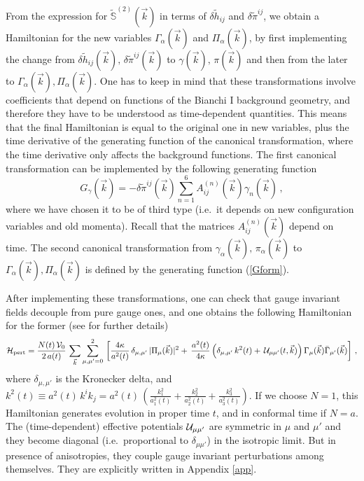 \documentclass[11pt,tightenlines,eqsecnum,floats,aps,amsmath,amssymb,nofootinbib,prd,floatfix]{revtex4}
\newcommand{\be}{\nopagebreak[3]\begin{equation}}
\newcommand{\ee}{\end{equation}}
\def\v{\vec}
\newcommand{\<}{\langle}
\renewcommand{\>}{\rangle}
\begin{document}
From the expression for $\tilde{\mathbb{S}}^{(2)}(\vec k)$ in terms of $\delta \tilde{h}_{ij}$ and $\delta \tilde{\pi}^{ij}$, we obtain a Hamiltonian for the new variables $\Gamma_\alpha(\vec k)$ and $\Pi_{\alpha}(\vec k)$, by first implementing the change from $\delta \tilde{h}_{ij}(\vec k),\,  \delta \tilde{\pi}^{ij}(\vec k)$ to $\gamma(\vec k),\, \pi(\vec k)$ and then from the later to $\Gamma_\alpha(\vec k), \Pi_{\alpha}(\vec k)$. One has to keep in mind that these transformations involve coefficients that depend on functions of the Bianchi I background geometry, and therefore they have to be understood as time-dependent quantities. This means that the final Hamiltonian is equal to the original one in new variables, plus the time derivative of the generating function of the canonical transformation, where the time derivative only affects the background functions. The first  canonical transformation  can be implemented by the following generating function 
\begin{equation} \label{gform}
G_{\gamma}(\v k) = - \delta \tilde{\pi}^{ij}(\v k) \sum_{n=1}^6A^{(n)}_{ij}(\v k) \gamma_n(\v k)\, ,  
\end{equation}
where we have chosen it to be of third type (i.e.\, it depends on new configuration variables and old momenta). Recall that the matrices  $A^{(n)}_{ij}(\v k)$ depend on time. The second canonical transformation from $\gamma_\alpha(\vec k),\, \pi_\alpha(\vec k)$ to $\Gamma_\alpha(\vec k), \Pi_{\alpha}(\vec k)$ is defined by the generating function (\ref{Gform}).  

After implementing these transformations, one can check that  gauge invariant fields decouple from pure gauge ones, and one obtains the following Hamiltonian for the former (see \cite{aos} for further details)
\be \label{Ham2}\mathcal{H_{\rm pert}}=\frac{N(t)\,{\cal V}_0}{2\, a(t)}\, \sum_{\vec k}\sum_{\mu,\mu'=0}^2\, \left[ \frac{4\kappa}{a^2(t)}\, \delta_{\mu,\mu'}\, |\Pi_{\mu}(\vec k)|^2+\, \frac{a^2(t)}{4\kappa}\, \Big( \delta_{\mu,\mu'}\, k^2(t)+\, {\cal U}_{\mu \mu'}(t,\vec k)\Big)\, \Gamma_{\mu}(\vec k)\bar \Gamma_{\mu '}(\vec k)\right]\, ,\ee
where $\delta_{\mu,\mu'}$ is the Kronecker delta, and $k^2(t)\equiv a^2(t) \, k^ik_j=a^2(t)\, \left(\frac{k_1^2}{a_1^2(t)}+\frac{k_2^2}{a_2^2(t)}+\frac{k_3^2}{a_3^2(t)}\right)$. If we choose $N=1$, this Hamiltonian  generates evolution in proper time $t$, and in conformal time if $N=a$.  The (time-dependent) effective potentials $ {\cal U}_{\mu\mu'}$ are symmetric in $\mu$ and $\mu'$ and they become diagonal (i.e.\,  proportional to $
\delta_{\mu\mu'}$)  in the isotropic limit. But in presence of  anisotropies, they couple  gauge invariant perturbations among themselves. They are explicitly  written in Appendix \ref{app}.
\end{document}
